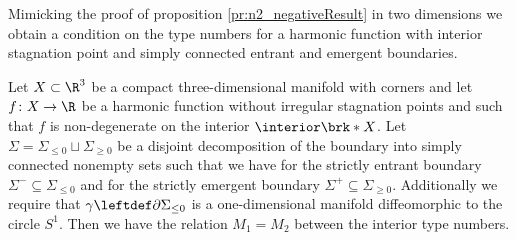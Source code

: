 Mimicking the proof of proposition \ref{pr:n2_negativeResult} in two dimensions we obtain a condition on the type numbers for a harmonic function with interior
stagnation point and simply connected entrant and emergent boundaries.
\begin{proposition}\label{pr:n3_inflowOutflowRels}
  Let $X\subset\R^3$ be a compact three-dimensional manifold with corners and
  let $f\colon X\to\R$ be a harmonic function without irregular stagnation points and such that $f$ is non-degenerate on the interior $\interior\brk*{X}$.
  Let $\Sigma=\Sigma_{\leq0}\sqcup\Sigma_{\geq0}$ be a disjoint decomposition of the boundary into simply connected nonempty sets such that
  we have for the strictly entrant boundary $\Sigma^-\subseteq\Sigma_{\leq0}$ and for the strictly emergent boundary
  $\Sigma^+\subseteq\Sigma_{\geq0}$. Additionally we require that $\gamma\leftdef\partial\Sigma_{\leq0}$ is a one-dimensional manifold diffeomorphic to the
  circle $S^1$.
  Then we have the relation $M_1=M_2$ between the interior type numbers.
\end{proposition}
